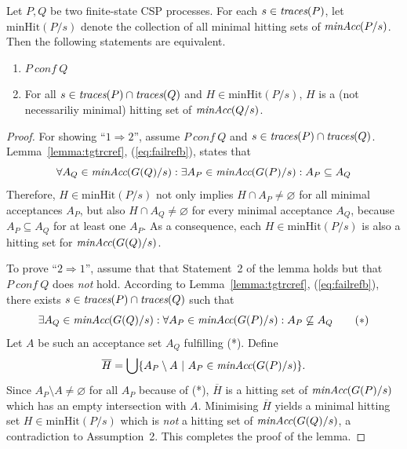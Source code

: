 \begin{lemma}
\label{lemma:hseta}
Let $P, Q$ be two finite-state CSP processes.
For each $s\in\text{\it traces}(P)$,
let $\text{minHit}(P/s)$ denote the
collection of all minimal hitting sets of $\text{\it minAcc}(P/s)$.
Then the following statements are equivalent.
\begin{enumerate}
\item $P\ conf\ Q$  

\item For all $s\in\text{\it traces}(P)\cap \text{\it traces}(Q)$ and $H \in  \text{minHit}(P/s)$, $H$ is
a (not necessariliy minimal) hitting set of $\text{\it minAcc}(Q/s)$.
\end{enumerate}
\end{lemma}
\begin{proof}
For showing ``$1 \Rightarrow 2$'', assume   $P\ conf\ Q$ and  
  $s\in\text{\it traces}(P)\cap \text{\it traces}(Q)$. Lemma~\ref{lemma:tgtrcref},
(\ref{eq:failrefb}), states that
\[
\forall A_Q\in\text{\it minAcc}(G(Q)/s):
\exists A_P\in\text{\it minAcc}(G(P)/s): A_P\subseteq A_Q
\]
Therefore, $H \in  \text{minHit}(P/s)$ not only implies $H\cap
A_P\neq\varnothing$ for all minimal acceptances $A_P$, but also $H\cap
A_Q\neq\varnothing$ for every minimal acceptance $A_Q$, because $A_P\subseteq
A_Q$ for at least one $A_P$. As a consequence, each $H \in
\text{minHit}(P/s)$ is also a hitting set for $\text{\it minAcc}(G(Q)/s)$.

To prove ``$2 \Rightarrow 1$'', assume that that Statement~2 of the lemma holds but 
that  $P\ conf\ Q$ does {\it not} hold. 
According to Lemma~\ref{lemma:tgtrcref}, (\ref{eq:failrefb}), there
exists $s\in\text{\it traces}(P)\cap \text{\it traces}(Q)$ such that
\[
\exists A_Q\in\text{\it minAcc}(G(Q)/s): \forall A_P\in\text{\it minAcc}(G(P)/s): A_P\not\subseteq A_Q
\qquad (*)
\]
Let $A$ be such an acceptance set $A_Q$ fulfilling (*).
Define
\[
\overline H = \bigcup\{ A_P \setminus A~|~A_P\in\text{\it minAcc}(G(P)/s) \}.
\]
Since $A_P \setminus A \neq\varnothing$ for all $A_P$ because of (*),
$\overline H$ is a hitting set of $\text{\it minAcc}(G(P)/s)$ which has an  empty
intersection with $A$. 
Minimising $\overline H$ yields   a minimal hitting set $H\in
\text{minHit}(P/s)$ which is {\it not} a hitting set of $\text{\it minAcc}(G(Q)/s)$, a
contradiction to Assumption~2. This completes the proof of the lemma. \xbox
\end{proof}
%
 